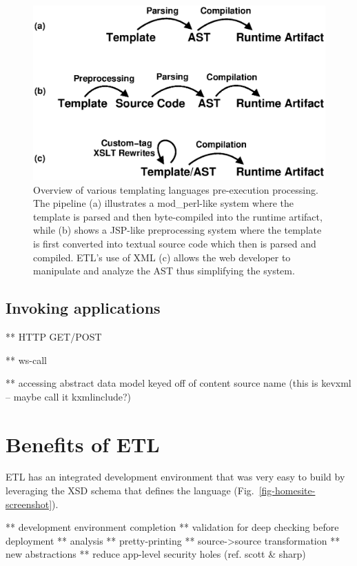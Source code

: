 \documentclass{www2003-submission}
\newcommand{\figref}[1]{Fig.~\ref{fig-#1}}
\begin{document}
\begin{figure}[tb]
\begin{centering}
\includegraphics[width=1\linewidth]{processing-stages-simple.eps}
\caption{Overview of various templating languages pre-execution
processing.  The pipeline (a) illustrates a mod\_perl-like system where
the template is parsed and then byte-compiled into the runtime
artifact, while (b) shows a JSP-like preprocessing system where the
template is first converted into textual source code which then is
parsed and compiled.  ETL's use of XML (c) allows the web developer to
manipulate and analyze the AST thus simplifying the system.
\label{fig-processing-stages}}
\end{centering}
\end{figure}


\subsection{Invoking applications}

** HTTP GET/POST

** ws-call

** accessing abstract data model keyed off of content source name
(this is kevxml -- maybe call it kxmlinclude?)


\section{Benefits of ETL}
\label{sec-benefits}

ETL has an integrated development environment that was very
easy to build by leveraging the XSD schema that defines the language
(\figref{homesite-screenshot}).

** development environment completion
** validation for deep checking before deployment
** analysis 
** pretty-printing 
** source->source transformation 
** new abstractions 
** reduce app-level security holes (ref. scott \& sharp)
\end{document}
